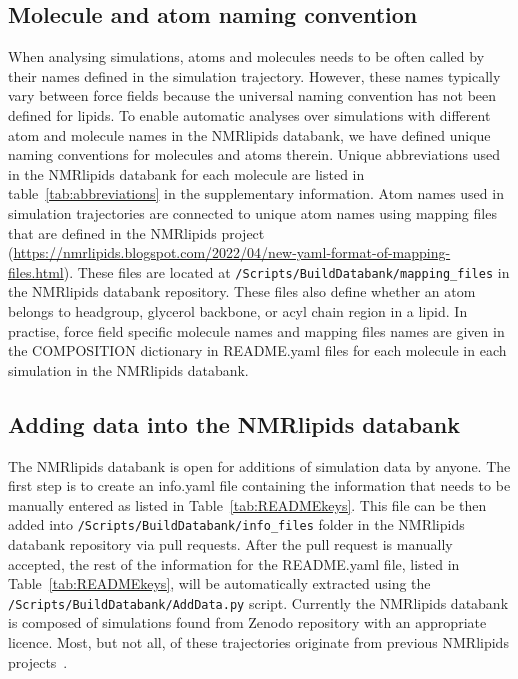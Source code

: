 \documentclass[fleqn,10pt]{wlscirep}
\begin{document}
\subsection{Molecule and atom naming convention} \label{naming}
When analysing simulations, atoms and molecules needs to be often called by their names defined in the simulation trajectory. However, these names typically vary between force fields because the universal naming convention has not been defined for lipids. To enable automatic analyses over simulations with different atom and molecule names in the NMRlipids databank, we have defined unique naming conventions for molecules and atoms therein. Unique abbreviations used in the NMRlipids databank for each molecule are listed in table~\ref{tab:abbreviations} in the supplementary information. Atom names used in simulation trajectories are connected to unique atom names using mapping files that are defined in the NMRlipids project (\url{https://nmrlipids.blogspot.com/2022/04/new-yaml-format-of-mapping-files.html}). These files are located at \texttt{/Scripts/BuildDatabank/mapping\_files} in the NMRlipids databank repository. These files also define whether an atom belongs to headgroup, glycerol backbone, or acyl chain region in a lipid. In practise, force field specific molecule names and mapping files
names are given in the COMPOSITION dictionary in README.yaml files for each molecule in each simulation in the NMRlipids databank.

\subsection{Adding data into the NMRlipids databank}
The NMRlipids databank is open for additions of simulation data by anyone. The first step is to create an info.yaml file containing the information that needs to be manually entered as listed in Table~\ref{tab:READMEkeys}. This file can be then added into \texttt{/Scripts/BuildDatabank/info\_files} folder in the NMRlipids databank repository via pull requests. After the pull request is manually accepted, the rest of the information for the README.yaml file, listed in Table~\ref{tab:READMEkeys}, will be automatically extracted using the \texttt{/Scripts/BuildDatabank/AddData.py} script. Currently the NMRlipids databank is composed of simulations found from Zenodo repository with an appropriate licence. Most, but not all, of these trajectories originate from previous NMRlipids projects~\cite{botan15,catte16,antila19,bacle21}.
\end{document}
